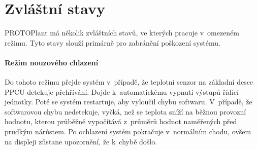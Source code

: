 \section{Zvláštní stavy}
PROTOPlant má několik zvláštních stavů, ve kterých pracuje v~omezeném režimu.
Tyto stavy slouží primárně pro zabránění poškození systému.

\paragraph{Režim nouzového chlazení}
\label{paragraph:CoolingMode}
Do tohoto režimu přejde systém v~případě, že teplotní senzor na základní desce PPCU detekuje přehřívání. 
Dojde k~automatickému vypnutí výstupů řídící jednotky.
Poté se systém restartuje, aby vyloučil chybu softwaru.
V~případě, že softwarovou chybu nedetekuje, vyčká, než se teplota sníží na běžnou provozní hodnotu, kterou průběžně vypočítává z~průměrů hodnot naměřených před prudkým nárůstem.
Po ochlazení systém pokračuje v~normálním chodu, ovšem na displeji zůstane upozornění, že k~chybě došlo.

\newpage